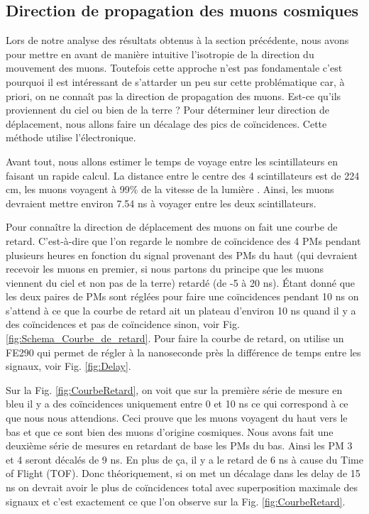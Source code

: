 \documentclass[12pt]{article}
\begin{document}
\subsection{Direction de propagation des muons cosmiques}
Lors de notre analyse des résultats obtenus à la section précédente, nous avons pour mettre en avant de manière intuitive l'isotropie de la direction du mouvement des muons. Toutefois cette approche n'est pas fondamentale c'est pourquoi il est intéressant de s'attarder un peu sur cette problématique car, à priori, on ne connaît pas la direction de propagation des muons. Est-ce qu'ils proviennent du ciel ou bien de la terre ? Pour déterminer leur direction de déplacement, nous allons faire un décalage des pics de coïncidences. Cette méthode utilise l'électronique.

Avant tout, nous allons estimer le temps de voyage entre les scintillateurs en faisant un rapide calcul. La distance entre le centre des 4 scintillateurs est de 224 cm, les muons voyagent à 99\% de la vitesse de la lumière \cite{vest_measuring_2010}. Ainsi, les muons devraient mettre environ 7.54 ns à voyager entre les deux scintillateurs.

Pour connaître la direction de déplacement des muons on fait une courbe de retard. C'est-à-dire que l'on regarde le nombre de coïncidence des 4 PMs pendant plusieurs heures en fonction du signal provenant des PMs du haut (qui devraient recevoir les muons en premier, si nous partons du principe que les muons viennent du ciel et non pas de la terre) retardé (de -5 à 20 ns). Étant donné que les deux paires de PMs sont réglées pour faire une coïncidences pendant 10 ns on s'attend à ce que la courbe de retard ait un plateau d'environ 10 ns quand il y a des coïncidences et pas de coïncidence sinon, voir Fig. \ref{fig:Schema_Courbe_de_retard}. Pour faire la courbe de retard, on utilise un FE290 qui permet de régler à la nanoseconde près la différence de temps entre les signaux, voir Fig. \ref{fig:Delay}.

Sur la Fig. \ref{fig:CourbeRetard}, on voit que sur la première série de mesure en bleu il y a des coïncidences uniquement entre 0 et 10 ns ce qui correspond à ce que nous nous attendions. Ceci prouve que les muons voyagent du haut vers le bas et que ce sont bien des muons d'origine cosmiques. Nous avons fait une deuxième série de mesures en retardant de base les PMs du bas. Ainsi les PM 3 et 4 seront décalés de 9 ns. En plus de ça, il y a le retard de 6 ns à cause du Time of Flight (TOF). Donc théoriquement, si on met un décalage dans les delay de 15 ns on devrait avoir le plus de coïncidences total avec superposition maximale des signaux et c'est exactement ce que l'on observe sur la Fig. \ref{fig:CourbeRetard}.
\end{document}

